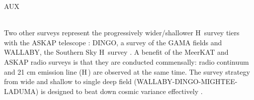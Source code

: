 {\begin{tasklist}{AUX}
\begin{task}
{~\\
Two other surveys represent the progressively wider/shallower H\,{} survey tiers with the ASKAP telescope \citep{johnston2007a}: DINGO, a survey of the GAMA fields \citep[][Meyer+ {\em in prep}]{driver2009a,duffy2012a,meyer2015a} and WALLABY, the Southern Sky H\,{} survey \citep[][Koribalski+ {\em in prep}]{duffy2012a}.
 A benefit of the MeerKAT and ASKAP radio surveys is that they are conducted commensally: radio continuum and 21 cm emission line (H\,{}) are observed at the same time. 
The survey strategy from wide and shallow to single deep field (WALLABY-DINGO-MIGHTEE-LADUMA) is designed to beat down cosmic variance effectively \citep[see e.g.,][]{maddox2016a}.
}
~\\
~\\
\end{task}



\end{tasklist}
}

